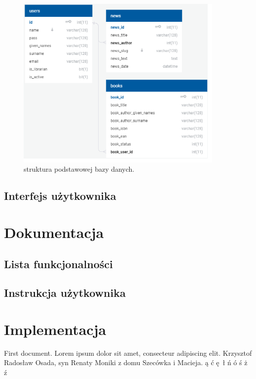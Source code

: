 \documentclass[12pt, a4paper]{article}
\begin{document}
\begin{figure}[h]
    \centering
    \includegraphics[width=0.9\textwidth]{diagram_db.png}
    \caption{struktura podstawowej bazy danych.}
    \label{fig:dbdiagram}
\end{figure}

\subsection{Interfejs użytkownika}

\section{Dokumentacja}
\subsection{Lista funkcjonalności}
\subsection{Instrukcja użytkownika}

\section{Implementacja}

First document. Lorem ipsum dolor sit amet, consecteur adipiscing elit.
Krzysztof Radosław Osada, syn Renaty Moniki z domu Szecówka i Macieja.
ą ć ę ł ń ó ś ż ź
\end{document}
